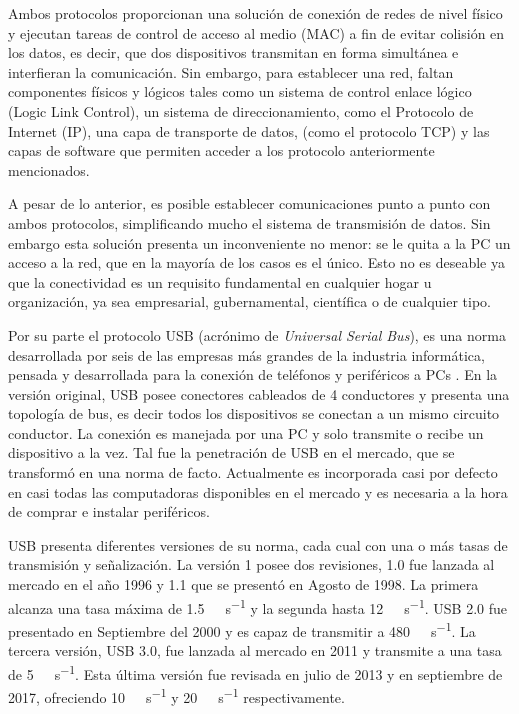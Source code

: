 Ambos protocolos proporcionan una solución de conexión de redes de nivel físico y ejecutan tareas de control de acceso al medio (MAC) a fin de evitar colisión en los datos, es decir, que dos dispositivos transmitan en forma simultánea e interfieran la comunicación.
Sin embargo, para establecer una red, faltan componentes físicos y lógicos tales como un sistema de control enlace lógico (Logic Link Control), un sistema de direccionamiento, como el Protocolo de Internet (IP), una capa de transporte de datos, (como el protocolo TCP) y las capas de software que permiten acceder a los protocolo anteriormente mencionados.%

A pesar de lo anterior, es posible establecer comunicaciones punto a punto con ambos protocolos, simplificando mucho el sistema de transmisión de datos. Sin embargo esta solución presenta un inconveniente no menor: se le quita a la PC un acceso a la red, que en la mayoría de los casos es el único. Esto no es deseable ya que la conectividad es un requisito fundamental en cualquier hogar u organización, ya sea empresarial, gubernamental, científica o de cualquier tipo.%

Por su parte el protocolo USB (acrónimo de {\it Universal Serial Bus}), es una norma desarrollada por seis de las empresas más grandes de la industria informática, pensada y desarrollada para la conexión de teléfonos y periféricos a PCs \cite{USBspec}. En la versión original, USB posee conectores cableados de 4 conductores y presenta una topología de bus, es decir todos los dispositivos se conectan a un mismo circuito conductor. La conexión es manejada por una PC y solo transmite o recibe un dispositivo a la vez. Tal fue la penetración de USB en el mercado, que se transformó en una norma de facto. Actualmente es incorporada casi por defecto en casi todas las computadoras disponibles en el mercado y es necesaria a la hora de comprar e instalar periféricos.%

USB presenta diferentes versiones de su norma, cada cual con una o más tasas de transmisión y señalización. La versión 1 posee dos revisiones, 1.0 fue lanzada al mercado en el año 1996 y 1.1 que se presentó en Agosto de 1998. La primera alcanza una tasa máxima de \SI{1.5}{\mega\bit\per\second} y la segunda hasta \SI{12}{\mega\bit\per\second}. USB 2.0 fue presentado en Septiembre del 2000 y es capaz de transmitir a \SI{480}{\mega\bit\per\second}. La tercera versión, USB 3.0, fue lanzada al mercado en 2011 y transmite a una tasa de \SI{5}{\giga\bit\per\second}. Esta última versión fue revisada en julio de 2013 y en septiembre de 2017, ofreciendo \SI{10}{\giga\bit\per\second} y \SI{20}{\giga\bit\per\second} respectivamente.%

